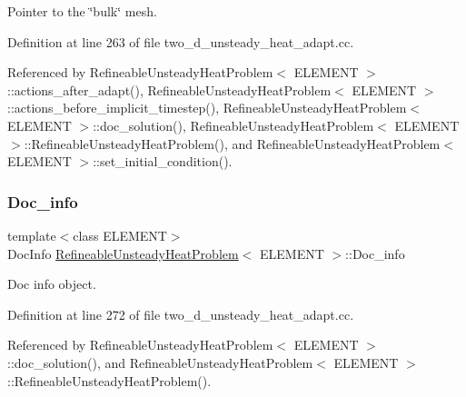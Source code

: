 Pointer to the \char`\"{}bulk\char`\"{} mesh. 



Definition at line 263 of file two\+\_\+d\+\_\+unsteady\+\_\+heat\+\_\+adapt.\+cc.



Referenced by Refineable\+Unsteady\+Heat\+Problem$<$ E\+L\+E\+M\+E\+N\+T $>$\+::actions\+\_\+after\+\_\+adapt(), Refineable\+Unsteady\+Heat\+Problem$<$ E\+L\+E\+M\+E\+N\+T $>$\+::actions\+\_\+before\+\_\+implicit\+\_\+timestep(), Refineable\+Unsteady\+Heat\+Problem$<$ E\+L\+E\+M\+E\+N\+T $>$\+::doc\+\_\+solution(), Refineable\+Unsteady\+Heat\+Problem$<$ E\+L\+E\+M\+E\+N\+T $>$\+::\+Refineable\+Unsteady\+Heat\+Problem(), and Refineable\+Unsteady\+Heat\+Problem$<$ E\+L\+E\+M\+E\+N\+T $>$\+::set\+\_\+initial\+\_\+condition().

\mbox{\label{classRefineableUnsteadyHeatProblem_a9ea9d79a57cb16a6292a637965767f7e}} 
\subsubsection{\texorpdfstring{Doc\+\_\+info}{Doc\_info}}
{\footnotesize\ttfamily template$<$class E\+L\+E\+M\+E\+NT$>$ \\
Doc\+Info \hyperlink{classRefineableUnsteadyHeatProblem}{Refineable\+Unsteady\+Heat\+Problem}$<$ E\+L\+E\+M\+E\+NT $>$\+::Doc\+\_\+info\hspace{0.3cm}{\ttfamily [private]}}



Doc info object. 



Definition at line 272 of file two\+\_\+d\+\_\+unsteady\+\_\+heat\+\_\+adapt.\+cc.



Referenced by Refineable\+Unsteady\+Heat\+Problem$<$ E\+L\+E\+M\+E\+N\+T $>$\+::doc\+\_\+solution(), and Refineable\+Unsteady\+Heat\+Problem$<$ E\+L\+E\+M\+E\+N\+T $>$\+::\+Refineable\+Unsteady\+Heat\+Problem().

\mbox{\label{classRefineableUnsteadyHeatProblem_a7ff1982af5819bab492c693178be0c24}} 

